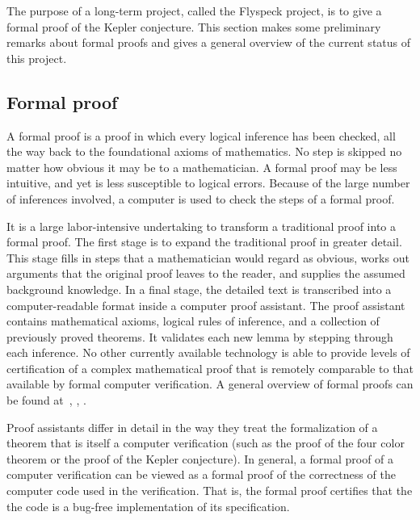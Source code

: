 \documentclass[11pt]{amsart}
\begin{document}
The purpose of a long-term project, called the Flyspeck project, is to give a formal proof of the Kepler conjecture.  This section makes some preliminary remarks about
formal proofs and gives a general overview of the current status of this project.


\subsection{Formal proof}

A formal proof is a proof in which every logical inference has been checked, all the way back to the foundational axioms of mathematics.  No step is skipped no matter how obvious it may be to a mathematician.  
A formal proof may be less intuitive, and yet is less susceptible to logical
errors.  Because of the large number of inferences involved, a computer is used to check the steps of a formal proof.

It is a large labor-intensive
undertaking to transform a traditional proof
into a formal proof.   The first stage is to expand the traditional proof in greater detail.  This stage fills in steps that a mathematician would regard as obvious,  works out arguments that the original proof leaves to the reader,  and supplies the assumed background knowledge.  
In a final stage, the detailed text is transcribed into a computer-readable format inside
a computer proof assistant.  The proof assistant  contains  mathematical axioms, logical rules of inference, and a collection of previously proved theorems. 
It validates each new lemma by stepping through each inference.  No other currently available technology is able to provide levels of certification of a complex mathematical proof that is remotely comparable to that available by formal computer verification.  A general overview
of formal proofs can be found at~\cite{gonthier:2008:formal}, \cite{Hales:2008:formal}, \cite{Harrison:2008:formal}.

Proof assistants differ in detail in the way they treat the formalization
of  a theorem that is itself a computer verification (such as
the proof of the four color theorem or the proof of the Kepler conjecture).
In general, a formal proof of a computer verification can be viewed
as a formal proof of the correctness of the computer code used in the
verification.  That is, the formal proof certifies that the the code
is a bug-free implementation of its specification.
\end{document}
